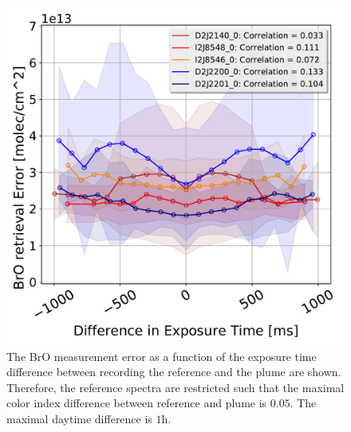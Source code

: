 \documentclass  [
  paper    = a4,
  BCOR     = 10mm,
  twoside,
  fontsize = 12pt,
  fleqn,
  toc      = bibnumbered,
  toc      = listofnumbered,
  numbers  = noendperiod,
  headings = normal,
  listof   = leveldown,
  version  = 3.03
]                                       {scrreprt}
\begin{document}
\begin{figure}[h]
	\centering
	\includegraphics[width=0.5\linewidth]{Bilder/BrOErr_OhnEVar/DiffExpTimewithoutOtherparamallInstruments}
	\caption{The BrO measurement error as a function of the exposure time difference between recording the reference and the plume are shown. Therefore, the reference spectra are restricted such that the maximal color index difference between reference and plume is $0.05$. The maximal daytime difference is $1$h.}
	\label{fig:diffexptimewithoutotherparamallinstruments}
\end{figure}
\end{document}
